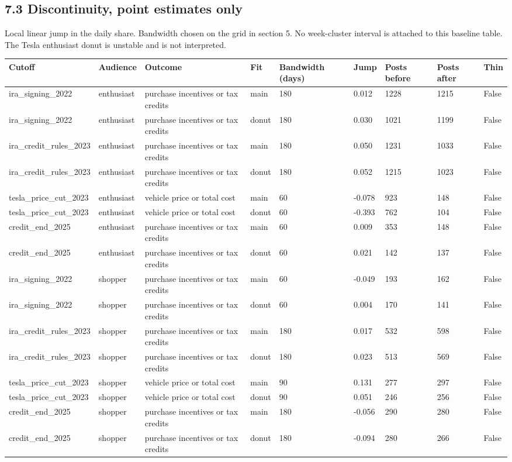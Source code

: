 \documentclass[11pt]{article}
\begin{document}
\subsection{7.3 Discontinuity, point estimates only}

Local linear jump in the daily share. Bandwidth chosen on the grid in section 5. No week-cluster interval is attached to this baseline table. The Tesla enthusiast donut is unstable and is not interpreted.


\begin{longtable}{lllllllll}
\toprule
Cutoff & Audience & Outcome & Fit & Bandwidth (days) & Jump & Posts before & Posts after & Thin \\
\midrule
ira\_signing\_2022 & enthusiast & purchase incentives or tax credits & main & 180 & 0.012 & 1228 & 1215 & False \\
ira\_signing\_2022 & enthusiast & purchase incentives or tax credits & donut & 180 & 0.030 & 1021 & 1199 & False \\
ira\_credit\_rules\_2023 & enthusiast & purchase incentives or tax credits & main & 180 & 0.050 & 1231 & 1033 & False \\
ira\_credit\_rules\_2023 & enthusiast & purchase incentives or tax credits & donut & 180 & 0.052 & 1215 & 1023 & False \\
tesla\_price\_cut\_2023 & enthusiast & vehicle price or total cost & main & 60 & -0.078 & 923 & 148 & False \\
tesla\_price\_cut\_2023 & enthusiast & vehicle price or total cost & donut & 60 & -0.393 & 762 & 104 & False \\
credit\_end\_2025 & enthusiast & purchase incentives or tax credits & main & 60 & 0.009 & 353 & 148 & False \\
credit\_end\_2025 & enthusiast & purchase incentives or tax credits & donut & 60 & 0.021 & 142 & 137 & False \\
ira\_signing\_2022 & shopper & purchase incentives or tax credits & main & 60 & -0.049 & 193 & 162 & False \\
ira\_signing\_2022 & shopper & purchase incentives or tax credits & donut & 60 & 0.004 & 170 & 141 & False \\
ira\_credit\_rules\_2023 & shopper & purchase incentives or tax credits & main & 180 & 0.017 & 532 & 598 & False \\
ira\_credit\_rules\_2023 & shopper & purchase incentives or tax credits & donut & 180 & 0.023 & 513 & 569 & False \\
tesla\_price\_cut\_2023 & shopper & vehicle price or total cost & main & 90 & 0.131 & 277 & 297 & False \\
tesla\_price\_cut\_2023 & shopper & vehicle price or total cost & donut & 90 & 0.051 & 246 & 256 & False \\
credit\_end\_2025 & shopper & purchase incentives or tax credits & main & 180 & -0.056 & 290 & 280 & False \\
credit\_end\_2025 & shopper & purchase incentives or tax credits & donut & 180 & -0.094 & 280 & 266 & False \\
\bottomrule
\end{longtable}
\end{document}
